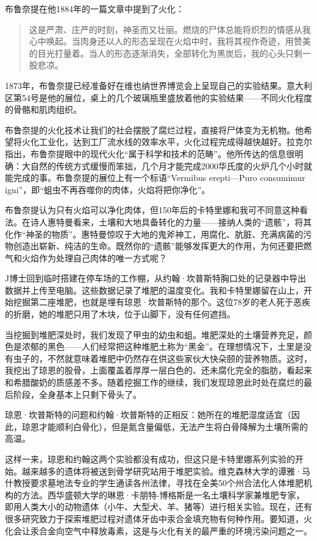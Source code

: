 \documentclass[12pt,oneside]{book}
\begin{document}
布鲁奈提在他1884年的一篇文章中提到了火化：

\begin{quotation}
这是严肃、庄严的时刻，神圣而又壮丽。燃烧的尸体总能将炽烈的情感从我心中唤起。当肉身还以人的形态呈现在火焰中时，我将其视作奇迹，用赞美的目光打量着。当人的形态逐渐消失，全部转化为黑炭后，我的心头只剩一股悲凉。
\end{quotation}

1873年，布鲁奈提已经准备好在维也纳世界博览会上呈现自己的实验结果。意大利区第54号是他的展位，桌上的几个玻璃瓶里盛放着他的实验结果——不同火化程度的骨骼和肌肉组织。

布鲁奈提的火化技术让我们的社会摆脱了腐烂过程，直接将尸体变为无机物。他希望将火化工业化，达到工厂流水线的效率水平，火化过程完成得越快越好。拉克尔指出，布鲁奈提眼中的现代火化“属于科学和技术的范畴”。他所传达的信息很明确：大自然的传统方式缓慢而笨拙，几个月才能完成2000华氏度的火炉几个小时就能完成的事。布鲁奈提的展位上有一个标语“Vermibus erepti—Puro consumimur igni”，即“蛆虫不再吞噬你的肉体，火焰将把你净化”。

布鲁奈提认为只有火焰可以净化肉体，但150年后的卡特里娜和我可不同意这种看法。在诗人惠特曼看来，土壤和大地具备转化的力量——接纳人类的“遗骸”，将其化作“神圣的物质”。惠特曼惊叹于大地的鬼斧神工，用腐化、肮脏、充满病菌的污物创造出崭新、纯洁的生命。既然你的“遗骸”能够发挥更大的作用，为何还要把燃气和火焰作为处理自己肉体的唯一方式呢？

J博士回到临时搭建在停车场的工作棚，从约翰·坎普斯特胸口处的记录器中导出数据并上传至电脑。这些数据记录了堆肥的温度变化。我和卡特里娜留在山上，开始挖掘第二座堆肥，也就是埋有琼恩·坎普斯特的那个。这位78岁的老人死于恶疾的折磨，她的堆肥只用了木块，位于山脚下，没有任何遮挡。

当挖掘到堆肥深处时，我们发现了甲虫的幼虫和蛆。堆肥深处的土壤营养充足，颜色是浓郁的黑色——人们经常把这种堆肥土称为“黑金”。在理想情况下，土里是没有虫子的，不然就意味着堆肥中仍然存在供这些家伙大快朵颐的营养物质。这时，我挖出了琼恩的股骨，上面覆盖着厚厚一层白色的、还未腐化完全的脂肪，看起来和希腊酸奶的质感差不多。随着挖掘工作的继续，我们发现琼恩此时处在腐烂的最后阶段，全身基本上只剩下骨头了。

琼恩·坎普斯特的问题和约翰·坎普斯特的正相反：她所在的堆肥湿度适宜（因此，琼恩才能顺利白骨化），但是氮含量偏低，无法产生将白骨降解为土壤所需的高温。

这样一来，琼恩和约翰这两个实验都没有成功，但这只是卡特里娜系列实验的开始。越来越多的遗体将被送到骨学研究站用于堆肥实验。维克森林大学的谭雅·马什教授要求墓地法专业的学生通读各州法律，寻找在全美50个州合法化人体堆肥机构的方法。西华盛顿大学的琳恩·卡朋特-博格斯是一名土壤科学家兼堆肥专家，即用人类大小的动物遗体（小牛、大型犬、羊、猪等）进行相关实验。现在，还有很多研究致力于探索堆肥过程对遗体牙齿中汞合金填充物有何种作用。要知道，火化会让汞合金向空气中释放毒素，这是与火化有关的最严重的环境污染问题之一。
\end{document}
